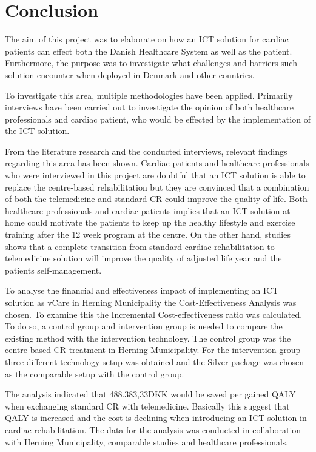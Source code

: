 \chapter{Conclusion}

The aim of this project was to elaborate on how an ICT solution for cardiac patients can effect both the Danish Healthcare System as well as the patient. Furthermore, the purpose was to investigate what challenges and barriers such solution encounter when deployed in Denmark and other countries. 

To investigate this area, multiple methodologies have been applied. Primarily interviews have been carried out to investigate the opinion of both healthcare professionals and cardiac patient, who would be effected by the implementation of the ICT solution. 

From the literature research and the conducted interviews, relevant findings regarding this area has been shown. Cardiac patients and healthcare professionals who were interviewed in this project are doubtful that an ICT solution is able to replace the centre-based rehabilitation but they are convinced that a combination of both the telemedicine and standard CR could improve the quality of life. Both healthcare professionals and cardiac patients implies that an ICT solution at home could motivate the patients to keep up the healthy lifestyle and exercise training after the 12 week program at the centre.  On the other hand, studies shows that a complete transition from standard cardiac rehabilitation to telemedicine solution will improve the quality of adjusted life year and the patients self-management. 

To analyse the financial and effectiveness impact of implementing an ICT solution as vCare in Herning Municipality the Cost-Effectiveness Analysis was chosen. To examine this the Incremental Cost-effectiveness ratio was calculated. To do so, a control group and intervention group is needed to compare the existing method with the intervention technology. The control group was the centre-based CR treatment in Herning Municipality. For the intervention group three different technology setup was obtained and the Silver package was chosen as the comparable setup with the control group.

The analysis indicated that 488.383,33DKK would be saved per gained QALY when exchanging standard CR with telemedicine. Basically this suggest that QALY is increased and the cost is declining when introducing an ICT solution in cardiac rehabilitation.  The data for the analysis was conducted in collaboration with Herning Municipality, comparable studies and healthcare professionals.

